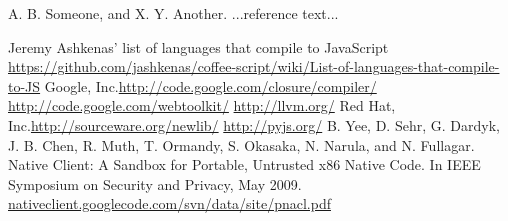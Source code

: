 \documentclass[11pt]{proc}
\begin{document}
\begin{thebibliography}{}

A. B. Someone, and X. Y. Another. ...reference text...

Jeremy Ashkenas' list of languages that compile to JavaScript \url{https://github.com/jashkenas/coffee-script/wiki/List-of-languages-that-compile-to-JS}
Google, Inc.\url{http://code.google.com/closure/compiler/}
\url{http://code.google.com/webtoolkit/}
\url{http://llvm.org/}
Red Hat, Inc.\url{http://sourceware.org/newlib/}
\url{http://pyjs.org/}
 B. Yee, D. Sehr, G. Dardyk, J. B. Chen, R. Muth, T. Ormandy, S.
Okasaka, N. Narula, and N. Fullagar. Native Client: A Sandbox for
Portable, Untrusted x86 Native Code. In IEEE Symposium on
Security and Privacy, May 2009.
\url{nativeclient.googlecode.com/svn/data/site/pnacl.pdf}
\end{thebibliography}
\end{document}
